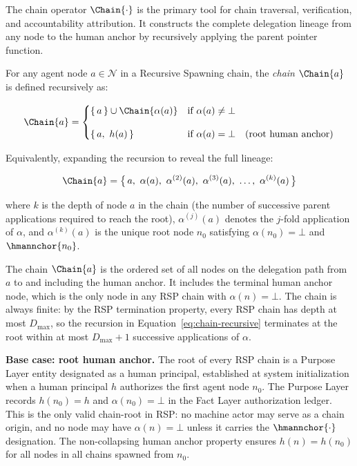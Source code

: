 The chain operator $\Chain{\cdot}$ is the primary tool for chain traversal, verification, and accountability attribution. It constructs the complete delegation lineage from any node to the human anchor by recursively applying the parent pointer function.

\begin{dfn}
\label{def:chain-operator}
For any agent node $a \in \mathcal{N}$ in a Recursive Spawning chain, the \emph{chain} $\Chain{a}$ is defined recursively as:

\begin{equation}
\Chain{a} =
\begin{cases}
\{\, a \,\} \cup \Chain{\alpha(a)} & \text{if } \alpha(a) \neq \bot \\[10pt]
\{\, a,\ h(a) \,\}                  & \text{if } \alpha(a) = \bot \quad \text{(root human anchor)}
\end{cases}
\label{eq:chain-recursive}
\end{equation}

Equivalently, expanding the recursion to reveal the full lineage:

\begin{equation}
\Chain{a} = \bigl\{\, a,\ \alpha(a),\ \alpha^{(2)}(a),\ \alpha^{(3)}(a),\ \ldots,\ \alpha^{(k)}(a) \,\bigr\}
\label{eq:chain-expanded}
\end{equation}

where $k$ is the depth of node $a$ in the chain (the number of successive parent applications required to reach the root), $\alpha^{(j)}(a)$ denotes the $j$-fold application of $\alpha$, and $\alpha^{(k)}(a)$ is the unique root node $n_0$ satisfying $\alpha(n_0) = \bot$ and $\hmannchor{n_0}$.
\end{dfn}

The chain $\Chain{a}$ is the ordered set of all nodes on the delegation path from $a$ to and including the human anchor. It includes the terminal human anchor node, which is the only node in any RSP chain with $\alpha(n) = \bot$. The chain is always finite: by the RSP termination property, every RSP chain has depth at most $D_{\max}$, so the recursion in Equation~\ref{eq:chain-recursive} terminates at the root within at most $D_{\max} + 1$ successive applications of $\alpha$.

\bigskip
\noindent\textbf{Base case: root human anchor.} The root of every RSP chain is a Purpose Layer entity designated as a human principal, established at system initialization when a human principal $h$ authorizes the first agent node $n_0$. The Purpose Layer records $h(n_0) = h$ and $\alpha(n_0) = \bot$ in the Fact Layer authorization ledger. This is the only valid chain-root in RSP: no machine actor may serve as a chain origin, and no node may have $\alpha(n) = \bot$ unless it carries the $\hmannchor{\cdot}$ designation. The non-collapsing human anchor property ensures $h(n) = h(n_0)$ for all nodes in all chains spawned from $n_0$.

